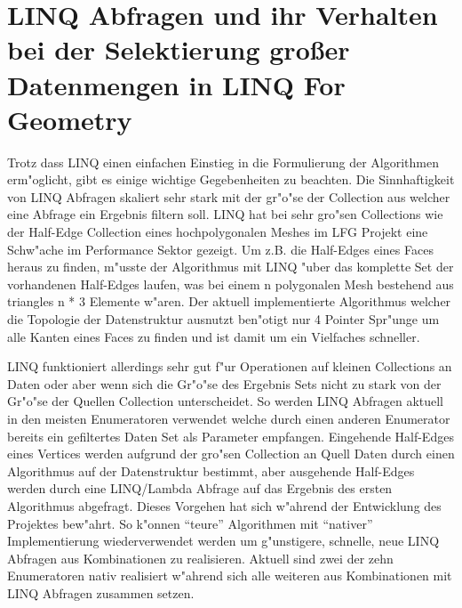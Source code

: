 \documentclass[pagesize, paper=a4, fontsize=12pt,titlepage=true, headings=small, headnosepline, abstractoff, liststotoc, nochapterprefix, plainheadsepline]{scrreprt}
\newcommand{\LFG}{LINQ For Geometry}
\begin{document}
	\section {LINQ Abfragen und ihr Verhalten bei der Selektierung großer Datenmengen in \LFG}
Trotz dass LINQ einen einfachen Einstieg in die Formulierung der Algorithmen erm"oglicht, gibt es einige wichtige Gegebenheiten zu beachten. Die Sinnhaftigkeit von LINQ Abfragen skaliert sehr stark mit der gr"o"se der Collection aus welcher eine Abfrage ein Ergebnis filtern soll. LINQ hat bei sehr gro"sen Collections wie der Half-Edge Collection eines hochpolygonalen Meshes im LFG Projekt eine Schw"ache im Performance Sektor gezeigt. Um z.B. die Half-Edges eines Faces heraus zu finden, m"usste der Algorithmus mit LINQ "uber das komplette Set der vorhandenen Half-Edges laufen, was bei einem n polygonalen Mesh bestehend aus triangles n * 3 Elemente w"aren. Der aktuell implementierte Algorithmus welcher die Topologie der Datenstruktur ausnutzt ben"otigt nur 4 Pointer Spr"unge um alle Kanten eines Faces zu finden und ist damit um ein Vielfaches schneller.
\newline

LINQ funktioniert allerdings sehr gut f"ur Operationen auf kleinen Collections an Daten oder aber wenn sich die Gr"o"se des Ergebnis Sets nicht zu stark von der Gr"o"se der Quellen Collection unterscheidet. So werden LINQ Abfragen aktuell in den meisten Enumeratoren verwendet welche durch einen anderen Enumerator bereits ein gefiltertes Daten Set als Parameter empfangen. Eingehende Half-Edges eines Vertices werden aufgrund der gro"sen Collection an Quell Daten durch einen Algorithmus auf der Datenstruktur bestimmt, aber ausgehende Half-Edges werden durch eine LINQ/Lambda Abfrage auf das Ergebnis des ersten Algorithmus abgefragt. Dieses Vorgehen hat sich w"ahrend der Entwicklung des Projektes bew"ahrt. So k"onnen "`teure"' Algorithmen mit "`nativer"' Implementierung wiederverwendet werden um g"unstigere, schnelle, neue LINQ Abfragen aus Kombinationen zu realisieren. Aktuell sind zwei der zehn Enumeratoren nativ realisiert w"ahrend sich alle weiteren aus Kombinationen mit LINQ Abfragen zusammen setzen.
\newline
\end{document}
